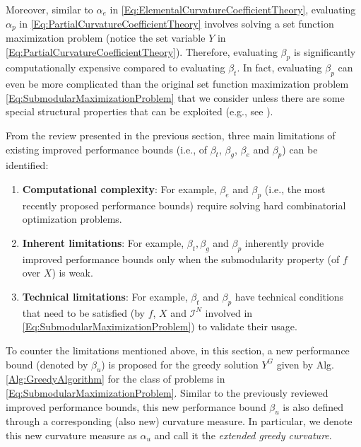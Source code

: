 \documentclass[letterpaper, 10 pt, conference]{ieeeconf}
\begin{document}
{Moreover, similar to $\alpha_e$ in \eqref{Eq:ElementalCurvatureCoefficientTheory}, evaluating $\alpha_p$ in \eqref{Eq:PartialCurvatureCoefficientTheory} involves solving a set function maximization problem (notice the set variable $Y$ in \eqref{Eq:PartialCurvatureCoefficientTheory}). Therefore, evaluating $\beta_p$ is significantly computationally expensive compared to evaluating $\beta_t$. In fact, evaluating $\beta_p$ can even be more complicated than the original set function maximization problem \eqref{Eq:SubmodularMaximizationProblem} that we consider unless there are some special structural properties that can be exploited (e.g., see \cite[Ch. 3.2.4]{Welikala2021Thesis}).








From the review presented in the previous section, three main limitations of existing improved performance bounds (i.e., of $\beta_t$\cite{Conforti1984}, $\beta_g$\cite{Conforti1984}, $\beta_e$\cite{Wang2016} and $\beta_p$\cite{Liu2018}) can be identified: 
\begin{enumerate}
    \item \textbf{Computational complexity}: For example, $\beta_e$ and $\beta_p$ (i.e., the most recently proposed performance bounds) require solving hard combinatorial optimization problems. 
    \item \textbf{Inherent limitations}: For example, $\beta_t, \beta_g$ and $\beta_p$ inherently provide improved performance bounds only when the submodularity property (of $f$ over $X$) is weak.
    \item \textbf{Technical limitations}: For example, $\beta_t$ and $\beta_p$ have technical conditions that need to be satisfied (by $f$, $X$ and $\mathcal{I}^N$ involved in \eqref{Eq:SubmodularMaximizationProblem}) to validate their usage.
\end{enumerate}


To counter the limitations mentioned above, in this section, a new performance bound (denoted by $\beta_u$) is proposed for the greedy solution $Y^G$ given by Alg. \ref{Alg:GreedyAlgorithm} for the class of problems in \eqref{Eq:SubmodularMaximizationProblem}. Similar to the previously reviewed improved performance bounds, this new performance bound $\beta_u$ is also defined through a corresponding (also new) curvature measure. In particular, we denote this new curvature measure as $\alpha_u$ and call it the \emph{extended greedy curvature}.



}
\end{document}
